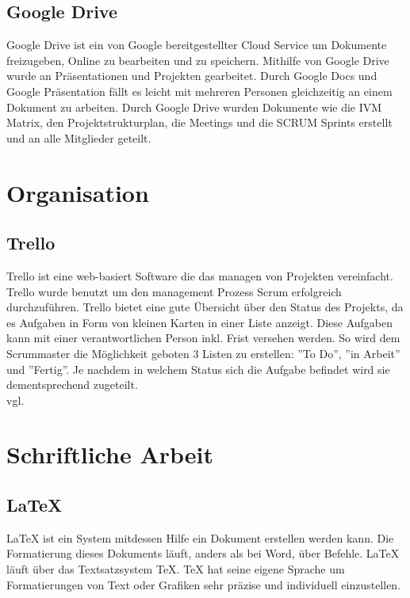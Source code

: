 \subsection {Google Drive}
\label{sec:GoogleDrive}
Google Drive ist ein von Google bereitgestellter Cloud Service um Dokumente freizugeben, Online zu bearbeiten und zu speichern.
Mithilfe von Google Drive wurde an Präsentationen und Projekten gearbeitet. Durch Google Docs und Google Präsentation fällt es leicht mit mehreren Personen gleichzeitig an einem Dokument zu arbeiten. Durch Google Drive wurden Dokumente wie die IVM Matrix, den Projektstrukturplan, die Meetings und die SCRUM Sprints erstellt und an alle Mitglieder geteilt. 
\section{Organisation}
\label{sec:Organisation}
\subsection {Trello}
\label{sec:Trello}
Trello ist eine web-basiert Software die das managen von Projekten vereinfacht. Trello wurde benutzt um den management Prozess Scrum erfolgreich durchzuführen. Trello bietet eine gute Übersicht über den Status des Projekts, da es Aufgaben in Form von kleinen Karten in einer Liste anzeigt. Diese Aufgaben kann mit einer verantwortlichen Person inkl. Frist versehen werden. So wird dem Scrummaster die Möglichkeit geboten 3 Listen zu erstellen: ''To Do'', ''in Arbeit'' und ''Fertig''. Je nachdem in welchem Status sich die Aufgabe befindet wird sie dementsprechend zugeteilt. \\vgl. \cite{trello} 
\section{Schriftliche Arbeit}
\label{sec:TechSchriftlicheArbeit}
\subsection {LaTeX}
\label{sec:LaTeX}
LaTeX ist ein System mitdessen Hilfe ein Dokument erstellen werden kann. Die Formatierung dieses Dokuments läuft, anders als bei Word, über Befehle. LaTeX läuft über das Textsatzsystem TeX. TeX hat seine eigene Sprache um Formatierungen von Text oder Grafiken sehr präzise und individuell einzustellen. 
